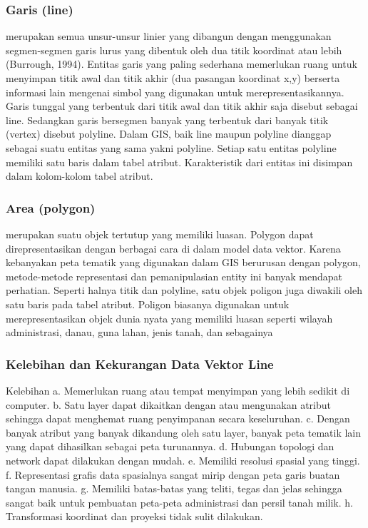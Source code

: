   \subsubsection{Garis (line)}
  merupakan semua unsur-unsur linier yang dibangun dengan menggunakan segmen-segmen garis lurus yang 
  dibentuk oleh dua titik koordinat atau lebih (Burrough, 1994). 
  Entitas garis yang paling sederhana memerlukan ruang untuk menyimpan titik awal dan titik akhir (dua pasangan koordinat x,y) 
  berserta informasi lain mengenai simbol yang digunakan untuk merepresentasikannya. 
  Garis tunggal yang terbentuk dari titik awal dan titik akhir saja disebut sebagai line. 
  Sedangkan garis bersegmen banyak yang terbentuk dari banyak titik (vertex) disebut polyline. 
  Dalam GIS, baik line maupun polyline dianggap sebagai suatu entitas yang sama yakni polyline. 
  Setiap satu entitas polyline memiliki satu baris dalam tabel atribut. 
  Karakteristik dari entitas ini disimpan dalam kolom-kolom tabel atribut. 
  
  \subsubsection{Area (polygon)}
  merupakan suatu objek tertutup yang memiliki luasan. Polygon dapat direpresentasikan dengan 
  berbagai cara di dalam model data vektor. Karena kebanyakan peta tematik yang digunakan dalam GIS berurusan dengan polygon,
  metode-metode representasi dan pemanipulasian entity ini banyak mendapat perhatian. 
  Seperti halnya titik dan polyline, satu objek poligon juga diwakili oleh satu baris pada tabel atribut. 
  Poligon biasanya digunakan untuk merepresentasikan objek dunia nyata yang memiliki luasan seperti 
  wilayah administrasi, danau, guna lahan, jenis tanah, dan sebagainya
 
 \subsubsection{Kelebihan dan Kekurangan Data Vektor Line}
 Kelebihan
 a. Memerlukan ruang atau tempat menyimpan yang lebih sedikit di computer.
 b. Satu layer dapat dikaitkan dengan atau mengunakan atribut sehingga dapat menghemat ruang penyimpanan secara keseluruhan.
 c. Dengan banyak atribut yang banyak dikandung oleh satu layer, banyak peta tematik lain yang dapat dihasilkan sebagai peta turunannya.
 d. Hubungan topologi dan network dapat dilakukan dengan mudah.
 e. Memiliki resolusi spasial yang tinggi.
 f. Representasi grafis data spasialnya sangat mirip dengan peta garis buatan tangan manusia.
 g. Memiliki batas-batas yang teliti, tegas dan jelas sehingga sangat baik untuk 
    pembuatan peta-peta administrasi dan persil tanah milik.
 h. Transformasi koordinat dan proyeksi tidak sulit dilakukan. 
 
